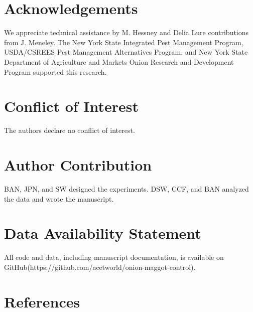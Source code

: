 \documentclass[alpha-refs]{wiley-article}
\begin{document}
\section*{Acknowledgements}
We appreciate technical assistance by M. Hessney and Delia Lure contributions from J. Meneley. The New York State Integrated Pest Management Program, USDA/CSREES Pest Management Alternatives Program, and New York State Department of Agriculture and Markets Onion Research and Development Program supported this research. 

\section*{Conflict of Interest}
The authors declare no conflict of interest.  

\section*{Author Contribution}
BAN, JPN, and SW designed the experiments.  DSW, CCF, and BAN analyzed the data and wrote the manuscript.  


\section*{Data Availability Statement}
All code and data, including manuscript documentation, is available on GitHub(https://github.com/acetworld/onion-maggot-control).



\section{References}




\end{document}
